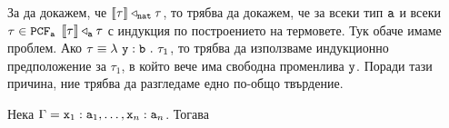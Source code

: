 За да докажем, че $\val{\tau} \triangleleft_{\vv{nat}} \tau$, то трябва да докажем, че за всеки тип $\vv{a}$ и всеки $\tau \in \vv{PCF}_{\vv{a}}$
$\val{\tau} \triangleleft_{\vv{a}} \tau$ с индукция по построението на термовете.
Тук обаче имаме проблем. Ако $\tau \equiv \lamb{y}{b}{\tau_1}$, то трябва да използваме индукционно предположение за $\tau_1$,
в който вече има свободна променлива $\vv{y}$. Поради тази причина, ние трябва да разгледаме едно по-общо твърдение.

\begin{framed}
  \begin{lemma}\label{lem:pcf:fundamental}
    Нека $\Gamma = \vv{x}_1:\vv{a}_1,\dots,\vv{x}_n:\vv{a}_n$. Тогава
    \begin{prooftree}
    \end{prooftree}
  \end{lemma}  
\end{framed}
